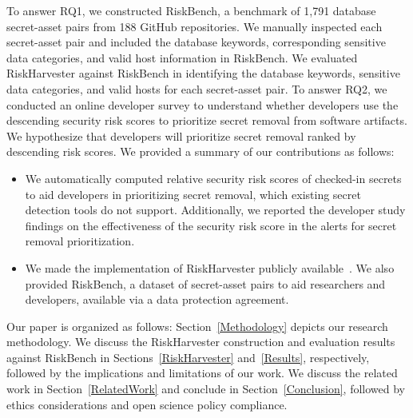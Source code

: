 To answer RQ1, we constructed RiskBench, a benchmark of 1,791 database secret-asset pairs from 188 GitHub repositories. We manually inspected each secret-asset pair and included the database keywords, corresponding sensitive data categories, and valid host information in RiskBench. We evaluated RiskHarvester against RiskBench in identifying the database keywords, sensitive data categories, and valid hosts for each secret-asset pair. To answer RQ2, we conducted an online developer survey to understand whether developers use the descending security risk scores to prioritize secret removal from software artifacts. We hypothesize that developers will prioritize secret removal ranked by descending risk scores. We provided a summary of our contributions as follows:


\begin{itemize}
    \item We automatically computed relative security risk scores of checked-in secrets to aid developers in prioritizing secret removal, which existing secret detection tools do not support. Additionally, we reported the developer study findings on the effectiveness of the security risk score in the alerts for secret removal prioritization.
    \item We made the implementation of RiskHarvester publicly available~\cite{riskartifacts}. We also provided RiskBench, a dataset of secret-asset pairs to aid researchers and developers, available via a data protection agreement.
\end{itemize}


Our paper is organized as follows: Section~\ref{Methodology} depicts our research methodology. We discuss the RiskHarvester construction and evaluation results against RiskBench in Sections~\ref{RiskHarvester} and~\ref{Results}, respectively, followed by the implications and limitations of our work. We discuss the related work in Section~\ref{RelatedWork} and conclude in Section~\ref{Conclusion}, followed by ethics considerations and open science policy compliance.
